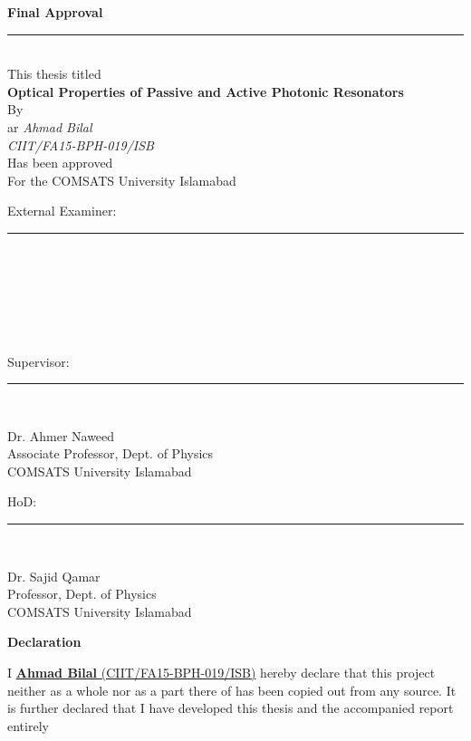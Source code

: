 \documentclass[12pt,twoside]{report}
\begin{document}
	\begin{center}
		\textbf{\Large{Final Approval}}
		\noindent\rule{15cm}{1pt} \\

		This thesis titled\\
		\vspace{0.5cm}
{\Large \textbf {Optical Properties of Passive and Active Photonic Resonators}}\\
\vspace{0.3cm}
By\\ar
\emph{Ahmad Bilal}\\
\emph{CIIT/FA15-BPH-019/ISB}\\
\vspace{0.1 in}
Has been approved\\
\vspace{0.1 in}
For the COMSATS University Islamabad\\
\end{center}
\vspace{0.5cm}
External Examiner: \noindent\rule{8cm}{0.4pt}\\\\\\\\\\\\
Supervisor: \hspace{1.35cm}\noindent\rule{8cm}{0.4pt}\\
\begin{center}
	Dr. Ahmer Naweed\\
	Associate Professor, Dept. of Physics\\
	COMSATS University Islamabad\\
\end{center}
\vspace{0.5cm}
HoD: \hspace{2.5cm}\noindent\rule{8cm}{0.4pt}\\
\begin{center}
	Dr. Sajid Qamar\\
	Professor, Dept. of Physics\\
	COMSATS University Islamabad
\end{center}
	\newpage
	\begin{center}
		\textbf{\Large{Declaration}}
		\end{center}
I \underline{\textbf{Ahmad Bilal} (CIIT/FA15-BPH-019/ISB)} hereby declare that this project
neither as a whole nor as a part there of has been copied out from any source. It is
further declared that I have developed this thesis and the accompanied report entirely
\end{document}
